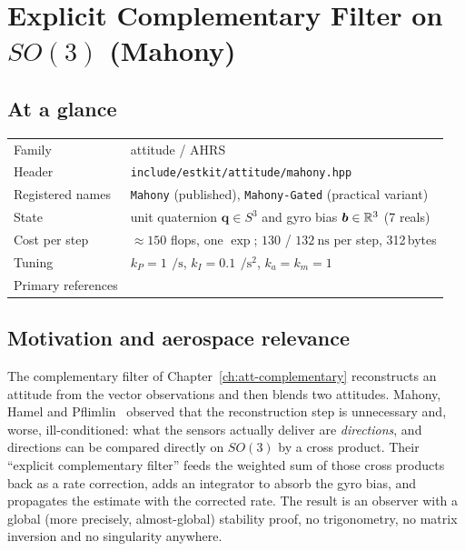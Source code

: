 \chapter{Explicit Complementary Filter on \texorpdfstring{$SO(3)$}{SO(3)} (Mahony)}
\label{ch:att-mahony}

\section*{At a glance}
\begin{tabular}{@{}l>{\raggedright\arraybackslash}p{}@{}}
Family & attitude / AHRS \\
Header & \texttt{include/estkit/attitude/mahony.hpp} \\
Registered names & \texttt{Mahony} (published), \texttt{Mahony-Gated} (practical variant) \\
State & unit quaternion $\bm{q}\in S^3$ and gyro bias $\bm{b}\in\mathbb{R}^3$ (7 reals) \\
Cost per step & $\approx150$ flops, one $\exp$;
  $130$ / $\SI{132}{\nano\second}$ per step, 312\,bytes \\
Tuning & $k_P=1\,\SI{}{\per\second}$, $k_I=0.1\,\SI{}{\per\second\squared}$, $k_a=k_m=1$ \\
Primary references & \cite{mahony2008,hamel2006,euston2008} \\
\end{tabular}

\section{Motivation and aerospace relevance}
The complementary filter of Chapter~\ref{ch:att-complementary} reconstructs an attitude from the
vector observations and then blends two attitudes. Mahony, Hamel and Pflimlin~\cite{mahony2008}
observed that the reconstruction step is unnecessary and, worse, ill-conditioned: what the sensors
actually deliver are \emph{directions}, and directions can be compared directly on $SO(3)$ by a
cross product. Their ``explicit complementary filter'' feeds the weighted sum of those cross
products back as a rate correction, adds an integrator to absorb the gyro bias, and propagates the
estimate with the corrected rate. The result is an observer with a global (more precisely,
almost-global) stability proof, no trigonometry, no matrix inversion and no singularity anywhere.

